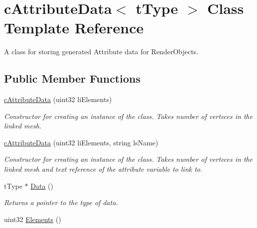 \hypertarget{classc_attribute_data}{
\section{cAttributeData$<$ tType $>$ Class Template Reference}
\label{classc_attribute_data}
}


A class for storing generated Attribute data for RenderObjects.  


\subsection*{Public Member Functions}
\begin{DoxyCompactItemize}
\item 
\hypertarget{classc_attribute_data_a833c523844faa905207e55d4473aeeb3}{
\hyperlink{classc_attribute_data_a833c523844faa905207e55d4473aeeb3}{cAttributeData} (uint32 liElements)}
\label{classc_attribute_data_a833c523844faa905207e55d4473aeeb3}

\begin{DoxyCompactList}\small\item\em Constructor for creating an instance of the class. Takes number of verteces in the linked mesh. \end{DoxyCompactList}\item 
\hypertarget{classc_attribute_data_a9c43ef79aec90c13493db09020e56551}{
\hyperlink{classc_attribute_data_a9c43ef79aec90c13493db09020e56551}{cAttributeData} (uint32 liElements, string lsName)}
\label{classc_attribute_data_a9c43ef79aec90c13493db09020e56551}

\begin{DoxyCompactList}\small\item\em Constructor for creating an instance of the class. Takes number of verteces in the linked mesh and text reference of the attribute variable to link to. \end{DoxyCompactList}\item 
\hypertarget{classc_attribute_data_aceea8fbe67e84433a660f0fc5700dc28}{
tType $\ast$ \hyperlink{classc_attribute_data_aceea8fbe67e84433a660f0fc5700dc28}{Data} ()}
\label{classc_attribute_data_aceea8fbe67e84433a660f0fc5700dc28}

\begin{DoxyCompactList}\small\item\em Returns a pointer to the type of data. \end{DoxyCompactList}\item 
\hypertarget{classc_attribute_data_a8326b7d4ad72493b4934dc0f730db98c}{
uint32 \hyperlink{classc_attribute_data_a8326b7d4ad72493b4934dc0f730db98c}{Elements} ()}
\label{classc_attribute_data_a8326b7d4ad72493b4934dc0f730db98c}


\end{DoxyCompactItemize}
